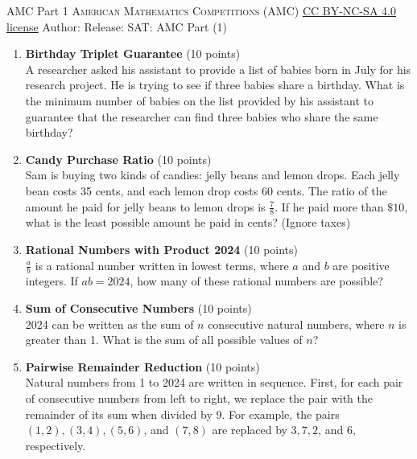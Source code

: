 \newpage\handout
{AMC Part 1}
{\textsc{American Mathematics Competitions (AMC)}}
{\href{https://creativecommons.org/licenses/by-nc-sa/4.0/}{CC BY-NC-SA 4.0 license}}
{Author: \BookAuthor}{Release: \generatedOn}
{SAT: AMC Part (1)}


\begin{enumerate}
  \item \textbf{Birthday Triplet Guarantee} (10 points)\\
  A researcher asked his assistant to provide a list of babies born in July for his research project. He is trying to see if three babies share a birthday. What is the minimum number of babies on the list provided by his assistant to guarantee that the researcher can find three babies who share the same birthday?
  \begin{subanswer}
  \end{subanswer}

  \item \textbf{Candy Purchase Ratio} (10 points)\\
  Sam is buying two kinds of candies: jelly beans and lemon drops. Each jelly bean costs 35 cents, and each lemon drop costs 60 cents. The ratio of the amount he paid for jelly beans to lemon drops is $\frac{7}{8}$. If he paid more than $\$10$, what is the least possible amount he paid in cents? (Ignore taxes)
  \begin{subanswer}
  \end{subanswer}

  \item \textbf{Rational Numbers with Product 2024} (10 points)\\
  $\frac{a}{b}$ is a rational number written in lowest terms, where $a$ and $b$ are positive integers. If $ab=2024$, how many of these rational numbers are possible?
  \begin{subanswer}
  \end{subanswer}

  \item \textbf{Sum of Consecutive Numbers} (10 points)\\
  2024 can be written as the sum of $n$ consecutive natural numbers, where $n$ is greater than 1. What is the sum of all possible values of $n$?
  \begin{subanswer}
  \end{subanswer}

  \item \textbf{Pairwise Remainder Reduction} (10 points)\\
  Natural numbers from 1 to 2024 are written in sequence. First, for each pair of consecutive numbers from left to right, we replace the pair with the remainder of its sum when divided by 9. For example, the pairs $(1,2),(3,4),(5,6)$, and $(7,8)$ are replaced by $3,7,2$, and $6$, respectively.


\end{enumerate}
